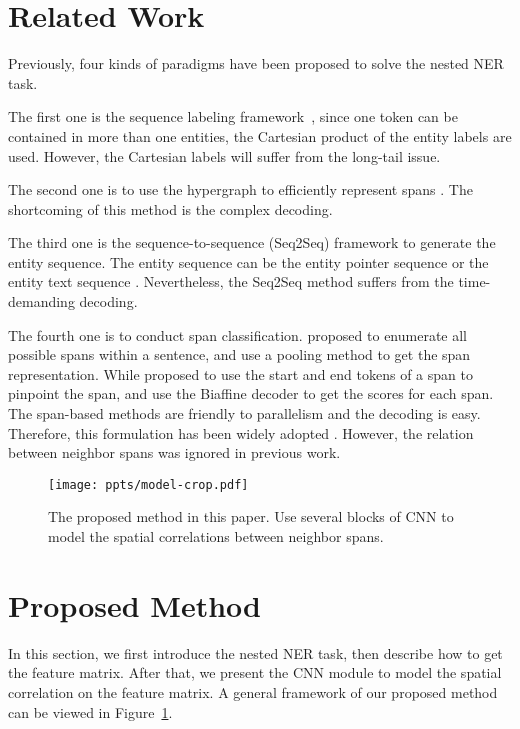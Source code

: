 \documentclass[11pt]{article}
\begin{document}
\section{Related Work}
Previously, four kinds of paradigms have been proposed to solve the nested NER task. 

The first one is the sequence labeling framework~\cite{DBLP:conf/acl/StrakovaSH19}, since one token can be contained in more than one entities, the Cartesian product of the entity labels are used. However, the Cartesian labels will suffer from the long-tail issue. 

The second one is to use the hypergraph to efficiently represent spans \cite{DBLP:conf/emnlp/LuR15,DBLP:conf/emnlp/MuisL16,DBLP:conf/naacl/KatiyarC18,DBLP:conf/emnlp/WangL18}. The shortcoming of this method is the complex decoding. 

The third one is the sequence-to-sequence (Seq2Seq) framework \cite{DBLP:conf/nips/SutskeverVL14,DBLP:conf/acl/LewisLGGMLSZ20,DBLP:journals/jmlr/RaffelSRLNMZLL20} to generate the entity sequence. The entity sequence can be the entity pointer sequence \cite{DBLP:conf/acl/YanGDGZQ20,DBLP:conf/aaai/0001JLLRL21} or the entity text sequence \cite{DBLP:conf/acl/0001LDXLHSW22}. Nevertheless, the Seq2Seq method suffers from the time-demanding decoding. 

The fourth one is to conduct span classification. \citet{DBLP:conf/ecai/EbertsU20} proposed to enumerate all possible spans within a sentence, and use a pooling method to get the span representation. While \citet{DBLP:conf/acl/YuBP20} proposed to use the start and end tokens of a span to pinpoint the span, and use the Biaffine decoder to get the scores for each span. The span-based methods are friendly to parallelism and the decoding is easy. Therefore, this formulation has been widely adopted \cite{DBLP:conf/acl/WanR0022,DBLP:conf/acl/Zhu022,DBLP:conf/aaai/Li00WZTJL22,DBLP:conf/acl/0002THH22}. However, the relation between neighbor spans was ignored in previous work. 






\begin{figure}[!t]
  \centering
  \texttt{[image: ppts/model-crop.pdf]}
  \caption{The proposed method in this paper. Use several blocks of CNN to model the spatial correlations between neighbor spans.} \label{fig:model}
\end{figure}


\section{Proposed Method}
In this section, we first introduce the nested NER task, then describe how to get the feature matrix. After that, we present the CNN module to model the spatial correlation on the feature matrix. A general framework of our proposed method can be viewed in Figure~\ref{fig:model}.
\end{document}
